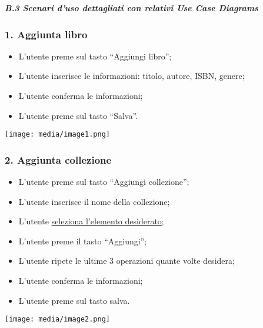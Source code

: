 \documentclass[a4paper,12pt]{report}
\begin{document}
\emph{\textbf{B.3 Scenari d'uso dettagliati con relativi Use Case
Diagrams}}

\subsubsection{1. Aggiunta libro}\label{aggiunta-libro}

\begin{itemize}
  \item
    L'utente preme sul tasto ``Aggiungi libro'';
  \item
    L'utente inserisce le informazioni: titolo, autore, ISBN, genere;
  \item
    L'utente conferma le informazioni;
  \item
    L'utente preme sul tasto ``Salva''.
\end{itemize}

\texttt{[image: media/image1.png]}

\subsubsection{}\label{section-2}

\subsubsection{2. Aggiunta collezione}\label{aggiunta-collezione}

\begin{itemize}
  \item
    L'utente preme sul tasto ``Aggiungi collezione'';
  \item
    L'utente inserisce il nome della collezione;
  \item
    L'utente \ul{seleziona l'elemento desiderato;}
  \item
    L'utente preme il tasto ``Aggiungi'';
  \item
    L'utente ripete le ultime 3 operazioni quante volte desidera;
  \item
    L'utente conferma le informazioni;
  \item
    L'utente preme sul tasto salva.
\end{itemize}

\texttt{[image: media/image2.png]}

\subsubsection{}\label{section-3}
\end{document}
